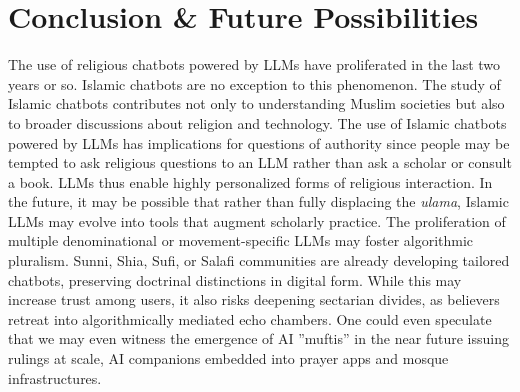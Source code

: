 \documentclass{article}
\begin{document}
\section{Conclusion \& Future Possibilities}
The use of religious chatbots powered by LLMs have proliferated in the last two years or so. Islamic chatbots are no exception to this phenomenon. The study of Islamic chatbots contributes not only to understanding Muslim societies but also to broader discussions about religion and technology. The use of Islamic chatbots powered by LLMs has implications for questions of authority since people may be tempted to ask religious questions to an LLM rather than ask a scholar or consult a book. LLMs thus enable highly personalized forms of religious interaction.  In the future, it may be possible that rather than fully displacing the \textit{ulama}, Islamic LLMs may evolve into tools that augment scholarly practice.  The proliferation of multiple denominational or movement-specific LLMs may foster algorithmic pluralism. Sunni, Shia, Sufi, or Salafi communities are already developing tailored chatbots, preserving doctrinal distinctions in digital form. While this may increase trust among users, it also risks deepening sectarian divides, as believers retreat into algorithmically mediated echo chambers. One could even speculate that we may even witness the emergence of AI ''muftis'' in the near future issuing rulings at scale, AI companions embedded into prayer apps and mosque infrastructures.

\end{document}
